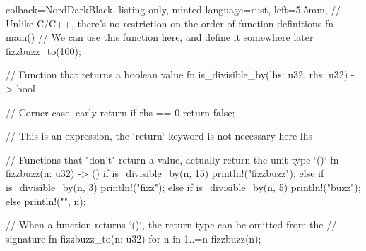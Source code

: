 \documentclass{article}
\begin{document}
\begin{tcblisting}{
        colback=NordDarkBlack,
        listing only,
        minted language=rust,
        left=5.5mm,
    }
// Unlike C/C++, there's no restriction on the order of function definitions
fn main() {
    // We can use this function here, and define it somewhere later
    fizzbuzz_to(100);
}

// Function that returns a boolean value
fn is_divisible_by(lhs: u32, rhs: u32) -> bool {
    // Corner case, early return
    if rhs == 0 {
        return false;
    }

    // This is an expression, the `return` keyword is not necessary here
    lhs %
}

// Functions that "don't" return a value, actually return the unit type `()`
fn fizzbuzz(n: u32) -> () {
    if is_divisible_by(n, 15) {
        println!("fizzbuzz");
    } else if is_divisible_by(n, 3) {
        println!("fizz");
    } else if is_divisible_by(n, 5) {
        println!("buzz");
    } else {
        println!("{}", n);
    }
}

// When a function returns `()`, the return type can be omitted from the
// signature
fn fizzbuzz_to(n: u32) {
    for n in 1..=n {
        fizzbuzz(n);
    }
}
\end{tcblisting}
\end{document}
